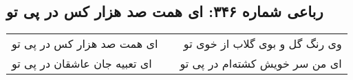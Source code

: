 \begin{center}
\section*{رباعی شماره ۳۴۶: ای همت صد هزار کس در پی تو}
\label{sec:sh346}
\begin{longtable}{l p{0.5cm} r}
ای همت صد هزار کس در پی تو
&&
وی رنگ گل و بوی گلاب از خوی تو
\\
ای تعبیه جان عاشقان در پی تو
&&
ای من سر خویش کشته‌ام در پی تو
\\
\end{longtable}
\end{center}
